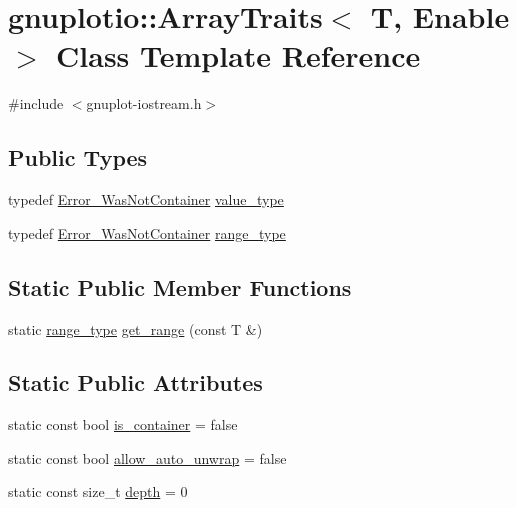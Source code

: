 \hypertarget{classgnuplotio_1_1_array_traits}{}\section{gnuplotio\+:\+:Array\+Traits$<$ T, Enable $>$ Class Template Reference}
\label{classgnuplotio_1_1_array_traits}


{\ttfamily \#include $<$gnuplot-\/iostream.\+h$>$}

\subsection*{Public Types}
\begin{DoxyCompactItemize}
\item 
typedef \hyperlink{structgnuplotio_1_1_error___was_not_container}{Error\+\_\+\+Was\+Not\+Container} \hyperlink{classgnuplotio_1_1_array_traits_a3bcae12a7bf42af90f4946acc66f27e0}{value\+\_\+type}
\item 
typedef \hyperlink{structgnuplotio_1_1_error___was_not_container}{Error\+\_\+\+Was\+Not\+Container} \hyperlink{classgnuplotio_1_1_array_traits_ae53464a5175c03deec403392b8dcb3c5}{range\+\_\+type}
\end{DoxyCompactItemize}
\subsection*{Static Public Member Functions}
\begin{DoxyCompactItemize}
\item 
static \hyperlink{classgnuplotio_1_1_array_traits_ae53464a5175c03deec403392b8dcb3c5}{range\+\_\+type} \hyperlink{classgnuplotio_1_1_array_traits_aee31432f330f9f9e4f5af628641181f7}{get\+\_\+range} (const T \&)
\end{DoxyCompactItemize}
\subsection*{Static Public Attributes}
\begin{DoxyCompactItemize}
\item 
static const bool \hyperlink{classgnuplotio_1_1_array_traits_ac5d19b25086565613c305960bd9d4a78}{is\+\_\+container} = false
\item 
static const bool \hyperlink{classgnuplotio_1_1_array_traits_a354d64663551a34c36c5fa7823859668}{allow\+\_\+auto\+\_\+unwrap} = false
\item 
static const size\+\_\+t \hyperlink{classgnuplotio_1_1_array_traits_a6fbd8c815e595f4efbcafd9b0eeb06f2}{depth} = 0
\end{DoxyCompactItemize}


